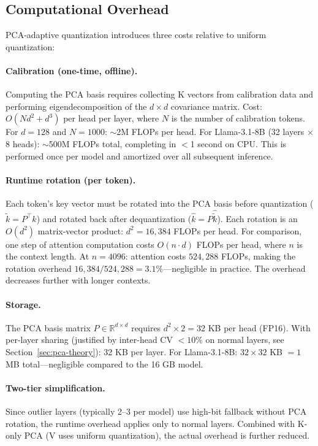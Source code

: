 \subsection{Computational Overhead}
\label{sec:complexity}

PCA-adaptive quantization introduces three costs relative to uniform quantization:

\paragraph{Calibration (one-time, offline).}
Computing the PCA basis requires collecting K vectors from calibration data and performing eigendecomposition of the $d \times d$ covariance matrix. Cost: $O(Nd^2 + d^3)$ per head per layer, where $N$ is the number of calibration tokens. For $d = 128$ and $N = 1000$: $\sim$2M FLOPs per head. For Llama-3.1-8B (32 layers $\times$ 8 heads): $\sim$500M FLOPs total, completing in $<$1 second on CPU. This is performed once per model and amortized over all subsequent inference.

\paragraph{Runtime rotation (per token).}
Each token's key vector must be rotated into the PCA basis before quantization ($\tilde{k} = P^\top k$) and rotated back after dequantization ($\hat{k} = P \hat{\tilde{k}}$). Each rotation is an $O(d^2)$ matrix-vector product: $d^2 = 16{,}384$ FLOPs per head. For comparison, one step of attention computation costs $O(n \cdot d)$ FLOPs per head, where $n$ is the context length. At $n = 4096$: attention costs $524{,}288$ FLOPs, making the rotation overhead $16{,}384 / 524{,}288 = 3.1\%$---negligible in practice. The overhead decreases further with longer contexts.

\paragraph{Storage.}
The PCA basis matrix $P \in \mathbb{R}^{d \times d}$ requires $d^2 \times 2 = 32$ KB per head (FP16). With per-layer sharing (justified by inter-head CV $< 10\%$ on normal layers, see Section~\ref{sec:pca-theory}): 32 KB per layer. For Llama-3.1-8B: $32 \times 32$ KB $= 1$ MB total---negligible compared to the 16 GB model.

\paragraph{Two-tier simplification.}
Since outlier layers (typically 2--3 per model) use high-bit fallback without PCA rotation, the runtime overhead applies only to normal layers. Combined with K-only PCA (V uses uniform quantization), the actual overhead is further reduced.


